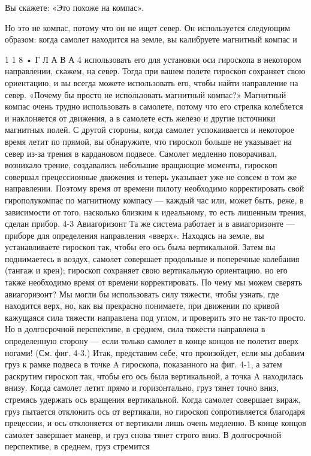 \documentclass[10pt,oneside]{article}
\newcommand{\TipsSubsection}[1]{\par\vspace{6bp}{\normalsize\bfseries #1\par}\vspace{2bp}}
\begin{document}
\TipsSubsection{4-2 Курсовой гироскоп Я начну с простейшего возможного применения гироскопа: если он находится в самолете, который меняет курс, ось вращения гироскопа --- установленная, например, горизонтально --- продолжает указывать в одном и том же направлении. Это очень полезно: при любых эволюциях самолета вы можете сохранять направление --- такой прибор называют курсовым гироскопом (см. рис. 4-2).}

Вы скажете: «Это похоже на компас».\par

Но это не компас, потому что он не ищет север. Он используется следующим образом: когда самолет находится на земле, вы калибруете магнитный компас и\par

1 1 8 • Г Л А В А  4 использовать его для установки оси гироскопа в некотором направлении, скажем, на север. Тогда при вашем полете гироскоп сохраняет свою ориентацию, и вы всегда можете использовать его, чтобы найти направление на север. «Почему бы просто не использовать магнитный компас?» Магнитный компас очень трудно использовать в самолете, потому что его стрелка колеблется и наклоняется от движения, а в самолете есть железо и другие источники магнитных полей. С другой стороны, когда самолет успокаивается и некоторое время летит по прямой, вы обнаружите, что гироскоп больше не указывает на север из-за трения в кардановом подвесе. Самолет медленно поворачивал, возникало трение, создавались небольшие вращающие моменты, гироскоп совершал прецессионные движения и теперь указывает уже не совсем в том же направлении. Поэтому время от времени пилоту необходимо корректировать свой гирополукомпас по магнитному компасу --- каждый час или, может быть, реже, в зависимости от того, насколько близким к идеальному, то есть лишенным трения, сделан прибор. 4-3 Авиагоризонт Та же система работает и в авиагоризонте --- приборе для определения направления «вверх». Находясь на земле, вы устанавливаете гироскоп так, чтобы его ось была вертикальной. Затем вы поднимаетесь в воздух, самолет совершает продольные и поперечные колебания (тангаж и крен); гироскоп сохраняет свою вертикальную ориентацию, но его также необходимо время от времени корректировать. По чему мы можем сверять авиагоризонт? Мы могли бы использовать силу тяжести, чтобы узнать, где находится верх, но, как вы прекрасно понимаете, при движении по кривой кажущаяся сила тяжести направлена под углом, и проверить это не так-то просто. Но в долгосрочной перспективе, в среднем, сила тяжести направлена в определенную сторону --- если только самолет в конце концов не полетит вверх ногами! (См. фиг. 4-3.) Итак, представим себе, что произойдет, если мы добавим груз к рамке подвеса в точке A гироскопа, показанного на фиг. 4-1, а затем раскрутим гироскоп так, чтобы его ось была вертикальной, а точка A находилась внизу. Когда самолет летит прямо и горизонтально, груз тянет точно вниз, стремясь удержать ось вращения вертикальной. Когда самолет совершает вираж, груз пытается отклонить ось от вертикали, но гироскоп сопротивляется благодаря прецессии, и ось отклоняется от вертикали лишь очень медленно. В конце концов самолет завершает маневр, и груз снова тянет строго вниз. В долгосрочной перспективе, в среднем, груз стремится 
\end{document}
